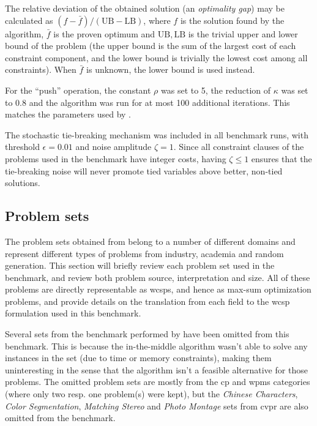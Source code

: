\label{pg:bench-method}
The relative deviation of the obtained solution (an \emph{optimality gap}) may be calculated as \((f - \bar{f})/(\mathrm{UB}-\mathrm{LB})\), where \(f\) is the solution found by the algorithm, \(\bar{f}\) is the proven optimum and \(\mathrm{UB}, \mathrm{LB}\) is the trivial upper and lower bound of the problem (the upper bound is the sum of the largest cost of each constraint component, and the lower bound is trivially the lowest cost among all constraints).
When \(\bar{f}\) is unknown, the lower bound is used instead.

For the \enquote{push} operation, the constant \(\rho\) was set to \num{5}, the reduction of \(\kappa\) was set to \num{0.8} and the algorithm was run for at most \num{100} additional iterations.
This matches the parameters used by \textcite{Bastert10}.

The stochastic tie-breaking mechanism was included in all benchmark runs, with threshold \(\epsilon=\num{0.01}\) and noise amplitude \(\zeta=1\).
Since all constraint clauses of the problems used in the benchmark have integer costs, having \(\zeta\leq1\) ensures that the tie-breaking noise will never promote tied variables above better, non-tied solutions.

\subsection{Problem sets}
The problem sets obtained from \textcite{deGivry14} belong to a number of different domains and represent different types of problems from industry, academia and random generation.
This section will briefly review each problem set used in the benchmark, and review both problem source, interpretation and size.
All of these problems are directly representable as \glspl{wcsp}, and hence as max-sum optimization problems, and \textcite{deGivry14} provide details on the translation from each field to the \gls{wcsp} formulation used in this benchmark.

Several sets from the benchmark performed by \textcite{deGivry14} have been omitted from this benchmark.
This is because the in-the-middle algorithm wasn't able to solve any instances in the set (due to time or memory constraints), making them uninteresting in the sense that the algorithm isn't a feasible alternative for those problems. 
The omitted problem sets are mostly from the \gls{cp} and \gls{wpms} categories (where only two resp. one problem(s) were kept), but the \emph{Chinese Characters}, \emph{Color Segmentation}, \emph{Matching Stereo} and \emph{Photo Montage} sets from \gls{cvpr} are also omitted from the benchmark.

